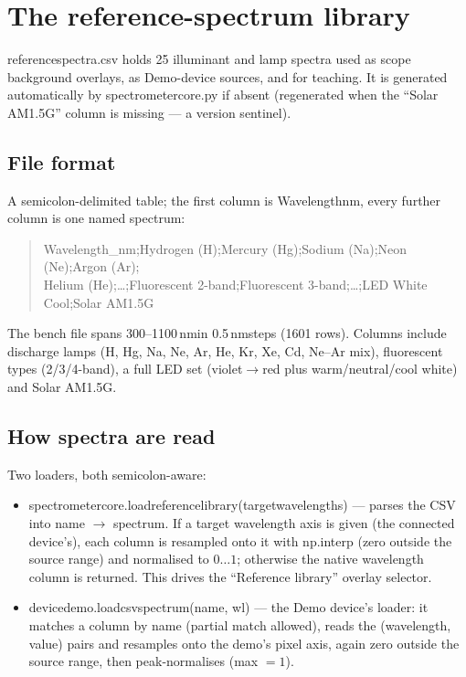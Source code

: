 \documentclass[12pt,a4paper]{article}
\DeclareRobustCommand{\code}[1]{{\ttfamily\small\def\_{\rawus\allowbreak}#1}}
\DeclareRobustCommand{\file}[1]{{\ttfamily\small\def\_{\rawus\allowbreak}#1}}
\newcommand{\nm}{\,nm}
\begin{document}
\section{The reference-spectrum library}\label{sec:refspectra}
\file{reference\_spectra.csv} holds 25 illuminant and lamp spectra used as scope
background overlays, as Demo-device sources, and for teaching. It is generated
automatically by \code{spectrometer\_core.py} if absent (regenerated when the
``Solar AM1.5G'' column is missing --- a version sentinel).

\subsection{File format}
A semicolon-delimited table; the first column is \code{Wavelength\_nm}, every
further column is one named spectrum:
\begin{quote}\ttfamily\scriptsize
Wavelength\_nm;Hydrogen (H);Mercury (Hg);Sodium (Na);Neon (Ne);Argon (Ar);\\
Helium (He);\dots;Fluorescent 2-band;Fluorescent 3-band;\dots;LED White Cool;Solar AM1.5G
\end{quote}
The bench file spans 300--1100\nm in 0.5\nm steps (1601 rows). Columns include
discharge lamps (H, Hg, Na, Ne, Ar, He, Kr, Xe, Cd, Ne--Ar mix), fluorescent
types (2/3/4-band), a full LED set (violet$\to$red plus warm/neutral/cool white)
and Solar AM1.5G.

\subsection{How spectra are read}
Two loaders, both semicolon-aware:
\begin{itemize}
  \item \code{spectrometer\_core.load\_reference\_library(target\_wavelengths)} ---
        parses the CSV into \code{name $\to$ spectrum}. If a target wavelength axis
        is given (the connected device's), each column is resampled onto it with
        \code{np.interp} (zero outside the source range) and normalised to
        $0\ldots1$; otherwise the native wavelength column is returned. This drives
        the ``Reference library'' overlay selector.
  \item \code{\_device\_demo.\_load\_csv\_spectrum(name, wl)} --- the Demo device's
        loader: it matches a column by name (partial match allowed), reads the
        \code{(wavelength, value)} pairs and resamples onto the demo's pixel axis,
        again zero outside the source range, then peak-normalises (max $=1$).
\end{itemize}
\end{document}
